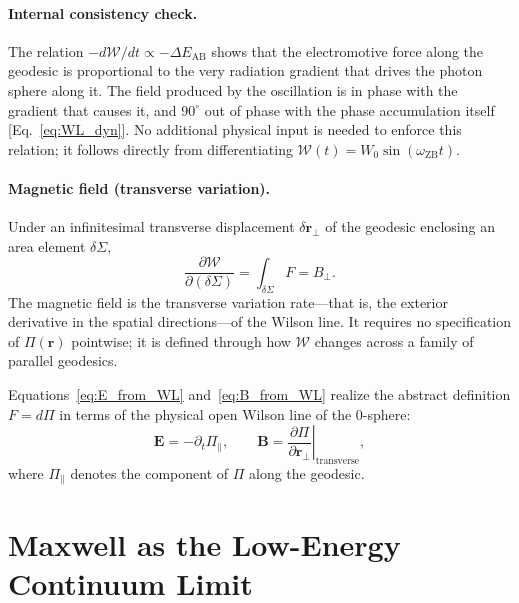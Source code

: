 \documentclass[%
 reprint, amsmath,amssymb, aps, prb, ]{revtex4-2}
\numberwithin{equation}{section}
\newcommand{\omZB}{\omega_{\text{ZB}}}
\newcommand{\Egrad}{\Delta E_{\text{AB}}}
\newcommand{\WL}{\mathcal{W}}
\begin{document}
\paragraph{Internal consistency check.}
The relation $-d\WL/dt \propto -\Egrad$ shows that the electromotive force along the geodesic is proportional to the very radiation gradient that drives the photon sphere along it. The field produced by the oscillation is in phase with the gradient that causes it, and $90^\circ$ out of phase with the phase accumulation itself [Eq.~\eqref{eq:WL_dyn}]. No additional physical input is needed to enforce this relation; it follows directly from differentiating $\WL(t)=W_0\sin(\omZB t)$.

\paragraph{Magnetic field (transverse variation).}
Under an infinitesimal transverse displacement $\delta\mathbf{r}_\perp$ of the geodesic enclosing an area element $\delta\Sigma$,
\begin{equation}
\frac{\partial\WL}{\partial(\delta\Sigma)}
= \int_{\delta\Sigma} F = B_\perp.
\label{eq:B_from_WL}
\end{equation}
The magnetic field is the transverse variation rate---that is, the exterior derivative in the spatial directions---of the Wilson line. It requires no specification of $\Pi(\mathbf{r})$ pointwise; it is defined through how $\WL$ changes across a family of parallel geodesics.

Equations~\eqref{eq:E_from_WL} and~\eqref{eq:B_from_WL} realize the abstract definition $F=d\Pi$ in terms of the physical open Wilson line of the 0-sphere:
\begin{equation}
\mathbf{E} = -\partial_t\Pi_{\parallel},\qquad
\mathbf{B} = \left.\frac{\partial\Pi}{\partial\mathbf{r}_\perp}\right|_{\text{transverse}},
\label{eq:EB_from_Pi}
\end{equation}
where $\Pi_{\parallel}$ denotes the component of $\Pi$ along the geodesic.

\section{Maxwell as the Low-Energy Continuum Limit}
\label{sec:maxwell}
\end{document}
